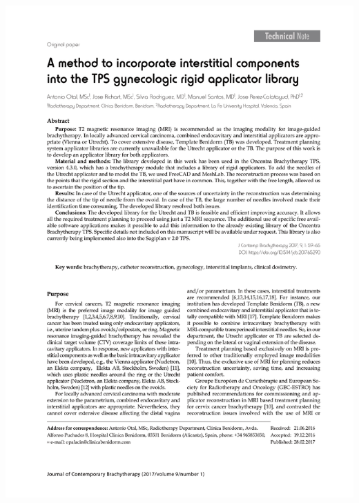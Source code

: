 \documentclass[
  a4paper,
]{scrreprt}
\begin{document}
\newpage{}

\includegraphics{articulos/librerias/librerias-1.png}
\end{document}

